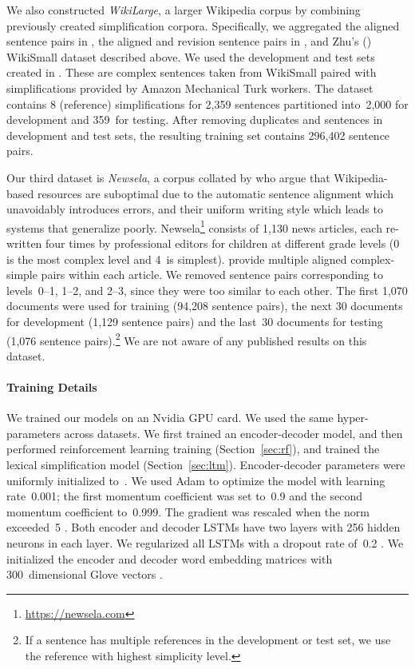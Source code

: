 \documentclass[11pt,letterpaper]{article}
\begin{document}
We also constructed \textit{WikiLarge}, a larger Wikipedia corpus by
combining previously created simplification corpora. Specifically, we
aggregated the aligned sentence pairs in
, the aligned and revision sentence
pairs in , and Zhu's
(\citeyear{zhu2010monolingual}) WikiSmall dataset described above. We
used the development and test sets created in
. These are complex sentences taken from WikiSmall
paired with simplifications provided by Amazon Mechanical Turk
workers. The dataset contains 8 (reference) simplifications for 2,359
sentences partitioned into~2,000 for development and 359~for
testing. After removing duplicates and sentences in development and
test sets, the resulting training set contains 296,402 sentence pairs.








Our third dataset is \textit{Newsela}, a corpus collated by
 who argue that Wikipedia-based resources
are suboptimal due to the automatic sentence alignment which
unavoidably introduces errors, and their uniform writing style which
leads to systems that generalize poorly.
Newsela\footnote{\url{https://newsela.com}} consists of 1,130 news articles,
each re-written four times by professional editors for children at
different grade levels (0 is the most complex level and 4~is
simplest).  provide multiple aligned
complex-simple pairs within each article.  We removed sentence pairs
corresponding to levels~\mbox{0--1}, \mbox{1--2}, and \mbox{2--3},
since they were too similar to each other. The first 1,070 documents
were used for training (94,208 sentence pairs), the next 30 documents
for development (1,129 sentence pairs) and the last~30 documents for
testing (1,076 sentence pairs).\footnote{If a sentence has multiple
	references in the development or test set, we use the reference with
	highest simplicity level.}  We are not aware of any published
results on this dataset.





\paragraph{Training Details}
We trained our models on an Nvidia GPU card. We used the
same hyper-parameters across datasets.  We first trained an
encoder-decoder model, and then performed reinforcement learning
training (Section~\ref{sec:rf}), and trained the lexical
simplification model (Section~\ref{sec:ltm}).  Encoder-decoder
parameters were uniformly initialized to~.  We used Adam
\cite{kingma:2014} to optimize the model with learning rate~0.001; the
first momentum coefficient was set to~0.9 and the second momentum
coefficient to~0.999. The gradient was rescaled when the norm
exceeded~5 \cite{pascanu:2013}. Both encoder and decoder LSTMs have
two layers with 256 hidden neurons in each layer. We regularized all
LSTMs with a dropout rate of~0.2
\cite{zaremba:2014}. We initialized the encoder and
decoder word embedding matrices with  300~dimensional Glove
vectors \cite{pennington:2014}.
\end{document}
